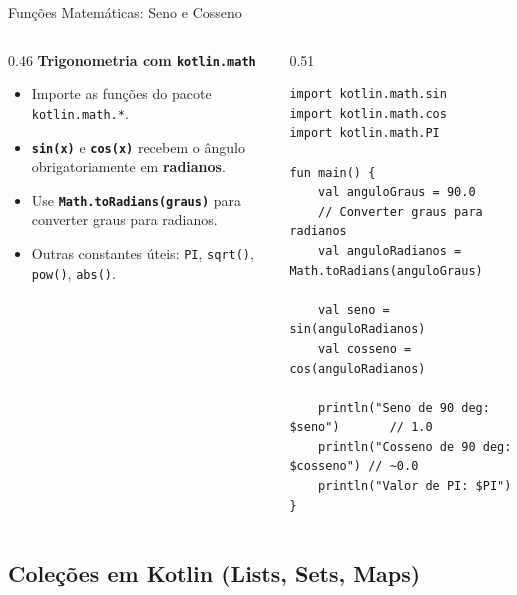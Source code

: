 \documentclass[aspectratio=169]{beamer}
\begin{document}
\begin{frame}[fragile]{Funções Matemáticas: Seno e Cosseno}
  \begin{columns}[T]
    \begin{column}{0.46\textwidth}
      \textbf{Trigonometria com \texttt{kotlin.math}}
      \vspace{0.3em}
      \begin{itemize}\small
        \item Importe as funções do pacote \texttt{kotlin.math.*}.
        \item \textbf{\texttt{sin(x)}} e \textbf{\texttt{cos(x)}} recebem o ângulo obrigatoriamente em \textbf{radianos}.
        \item Use \textbf{\texttt{Math.toRadians(graus)}} para converter graus para radianos.
        \item Outras constantes úteis: \texttt{PI}, \texttt{sqrt()}, \texttt{pow()}, \texttt{abs()}.
      \end{itemize}
    \end{column}
    \begin{column}{0.51\textwidth}
\begin{lstlisting}[style=KotlinStyle]
import kotlin.math.sin
import kotlin.math.cos
import kotlin.math.PI

fun main() {
    val anguloGraus = 90.0
    // Converter graus para radianos
    val anguloRadianos = Math.toRadians(anguloGraus)

    val seno = sin(anguloRadianos)
    val cosseno = cos(anguloRadianos)

    println("Seno de 90 deg: $seno")       // 1.0
    println("Cosseno de 90 deg: $cosseno") // ~0.0
    println("Valor de PI: $PI")
}
\end{lstlisting}
    \end{column}
  \end{columns}
\end{frame}

\subsection{Coleções em Kotlin (Lists, Sets, Maps)}
\end{document}
